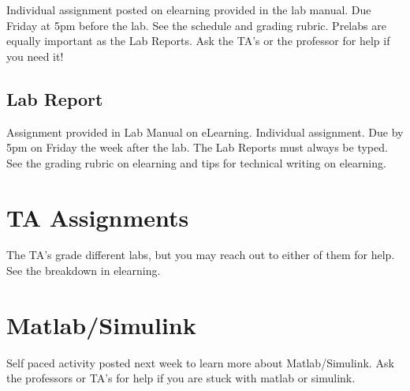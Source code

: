 \documentclass[12pt, a4paper]{report}
\begin{document}
  Individual assignment posted on elearning provided in the lab manual. Due Friday at 5pm before the lab. See the schedule and grading rubric. Prelabs are equally important as the Lab Reports. Ask the TA's or the professor for help if you need it!

  \subsection{Lab Report}

  Assignment provided in Lab Manual on eLearning. Individual assignment. Due by 5pm on Friday the week after the lab. The Lab Reports must always be typed. See the grading rubric on elearning and tips for technical writing on elearning.

  \section{TA Assignments}

  The TA's grade different labs, but you may reach out to either of them for help. See the breakdown in elearning.

  \section{Matlab/Simulink}

  Self paced activity posted next week to learn more about Matlab/Simulink. Ask the professors or TA's for help if you are stuck with matlab or simulink.
\end{document}
